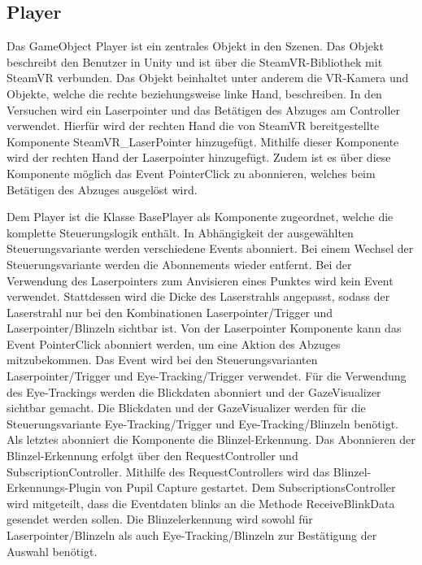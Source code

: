 \subsection{Player}
Das GameObject {\ttfamily Player} ist ein zentrales Objekt in den Szenen. Das Objekt beschreibt den Benutzer in Unity und ist über die SteamVR-Bibliothek mit SteamVR verbunden. Das Objekt beinhaltet unter anderem die VR-Kamera und Objekte, welche die rechte beziehungsweise linke Hand, beschreiben. In den Versuchen wird ein Laserpointer und das Betätigen des Abzuges am Controller verwendet. Hierfür wird der rechten Hand die von SteamVR bereitgestellte Komponente {\ttfamily SteamVR\_LaserPointer} hinzugefügt. Mithilfe dieser Komponente wird der rechten Hand der Laserpointer hinzugefügt. Zudem ist es über diese Komponente möglich das Event {\ttfamily PointerClick} zu abonnieren, welches beim Betätigen des Abzuges ausgelöst wird. 

Dem Player ist die Klasse {\ttfamily BasePlayer} als Komponente zugeordnet, welche die komplette Steuerungslogik enthält. In Abhängigkeit der ausgewählten Steuerungsvariante werden verschiedene Events abonniert. Bei einem Wechsel der Steuerungsvariante werden die Abonnements wieder entfernt. Bei der Verwendung des Laserpointers zum Anvisieren eines Punktes wird kein Event verwendet. Stattdessen wird die Dicke des Laserstrahls angepasst, sodass der Laserstrahl nur bei den Kombinationen Laserpointer/Trigger und Laserpointer/Blinzeln sichtbar ist. Von der Laserpointer Komponente kann das Event {\ttfamily PointerClick} abonniert werden, um eine Aktion des Abzuges mitzubekommen. Das Event wird bei den Steuerungsvarianten Laserpointer/Trigger und Eye-Tracking/Trigger verwendet. Für die Verwendung des Eye-Trackings werden die Blickdaten abonniert und der {\ttfamily GazeVisualizer} sichtbar gemacht. Die Blickdaten und der {\ttfamily GazeVisualizer} werden für die Steuerungsvariante Eye-Tracking/Trigger und Eye-Tracking/Blinzeln benötigt. Als letztes abonniert die Komponente die Blinzel-Erkennung. Das Abonnieren der Blinzel-Erkennung erfolgt über den {\ttfamily RequestController} und {\ttfamily SubscriptionController}. Mithilfe des {\ttfamily RequestControllers} wird das Blinzel-Erkennungs-Plugin von Pupil Capture gestartet. Dem {\ttfamily SubscriptionsController} wird mitgeteilt, dass die Eventdaten \glqq blinks\grqq{} an die Methode {\ttfamily ReceiveBlinkData} gesendet werden sollen. Die Blinzelerkennung wird sowohl für Laserpointer/Blinzeln als auch Eye-Tracking/Blinzeln zur Bestätigung der Auswahl benötigt.


